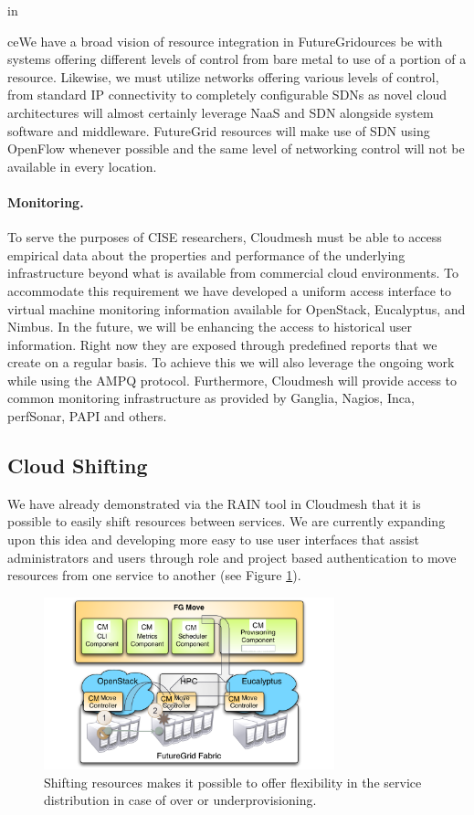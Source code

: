 \documentclass{article}
\begin{document}
in{ceWe have a broad vision of resource integration in FutureGridources be with systems offering different levels of control from bare metal to use of a portion of a resource. Likewise, we must utilize networks offering various levels of control, from standard IP connectivity to completely configurable SDNs as novel cloud architectures will almost certainly leverage NaaS and SDN alongside system software and middleware. FutureGrid resources will make use of SDN using OpenFlow whenever possible and the same level of networking control will not be available in every location.


\paragraph{Monitoring.}


To serve the purposes of CISE researchers, Cloudmesh must be able to access empirical data about the properties and performance of the underlying infrastructure beyond what is available from commercial cloud environments. To accommodate this requirement we have developed a uniform access interface to virtual machine monitoring information available for OpenStack, Eucalyptus, and Nimbus. In the future, we will be enhancing the access to historical user information. Right now they are exposed through predefined reports that we create on a regular basis. To achieve this we will also leverage the ongoing work while using the AMPQ protocol. Furthermore, Cloudmesh will provide access to common monitoring infrastructure as provided by Ganglia, Nagios, Inca, perfSonar, PAPI and others.




\subsection{Cloud Shifting}


We have already demonstrated via the RAIN tool in Cloudmesh that it is possible to easily shift resources between services. We are currently expanding upon this idea and developing more easy to use user interfaces that assist administrators and users through role and project based authentication to move resources from one service to another (see Figure \ref{F:shift}).


\begin{figure}[htb]
  \centering
    \includegraphics[width=0.75\textwidth]{images/shift2.pdf}
  \caption{Shifting resources makes it possible to offer flexibility
    in the service distribution in case of over or underprovisioning.}\label{F:shift}
\end{figure}


}
\end{document}
